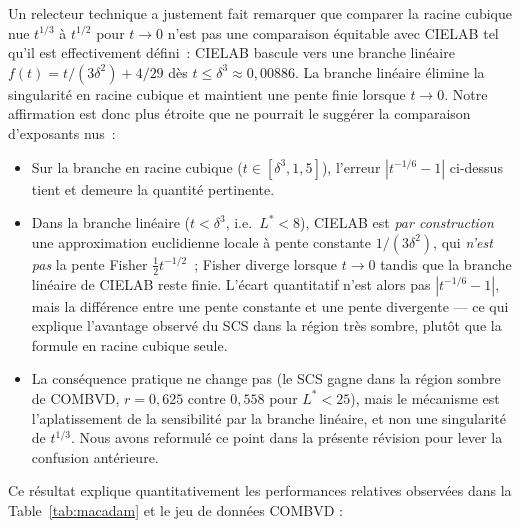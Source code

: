 \documentclass[12pt,a4paper]{article}
\begin{document}
\begin{remark}
Un relecteur technique a justement fait remarquer que comparer la
racine cubique nue $t^{1/3}$ \`a $t^{1/2}$ pour $t \to 0$ n'est pas
une comparaison \'equitable avec CIELAB tel qu'il est effectivement
d\'efini~: CIELAB bascule vers une branche lin\'eaire
$f(t) = t/(3\delta^2) + 4/29$ d\`es $t \leq \delta^3 \approx 0{,}00886$.
La branche lin\'eaire \'elimine la singularit\'e en racine cubique et
maintient une pente finie lorsque $t \to 0$. Notre affirmation est
donc plus \'etroite que ne pourrait le sugg\'erer la comparaison
d'exposants nus~:
\begin{itemize}[nosep]
\item Sur la branche en racine cubique ($t \in [\delta^3, 1{,}5]$),
  l'erreur $|t^{-1/6}-1|$ ci-dessus tient et demeure la quantit\'e
  pertinente.
\item Dans la branche lin\'eaire ($t < \delta^3$, i.e.\ $L^* < 8$),
  CIELAB est \emph{par construction} une approximation euclidienne
  locale \`a pente constante $1/(3\delta^2)$, qui \emph{n'est pas} la
  pente Fisher $\tfrac{1}{2}t^{-1/2}$~; Fisher diverge lorsque
  $t \to 0$ tandis que la branche lin\'eaire de CIELAB reste finie.
  L'\'ecart quantitatif n'est alors pas $|t^{-1/6}-1|$, mais la
  diff\'erence entre une pente constante et une pente divergente ---
  ce qui explique l'avantage observ\'e du SCS dans la r\'egion
  tr\`es sombre, plut\^ot que la formule en racine cubique seule.
\item La cons\'equence pratique ne change pas (le SCS gagne dans la
  r\'egion sombre de COMBVD, $r = 0{,}625$ contre $0{,}558$ pour
  $L^* < 25$), mais le m\'ecanisme est l'aplatissement de la
  sensibilit\'e par la branche lin\'eaire, et non une singularit\'e
  de $t^{1/3}$. Nous avons reformul\'e ce point dans la pr\'esente
  r\'evision pour lever la confusion ant\'erieure.
\end{itemize}
\end{remark}

Ce r\'esultat explique quantitativement les performances relatives
observ\'ees dans la Table~\ref{tab:macadam} et le jeu de donn\'ees
COMBVD :
\end{document}
